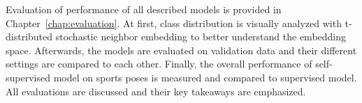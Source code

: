 Evaluation of performance of all described models is provided in Chapter~\ref{chap:evaluation}. At first, class distribution is visually analyzed with t-distributed stochastic neighbor embedding to better understand the embedding space. Afterwards, the models are evaluated on validation data and their different settings are compared to each other. Finally, the overall performance of self-supervised model on sports poses is measured and compared to supervised model. All evaluations are discussed and their key takeaways are emphasized.
